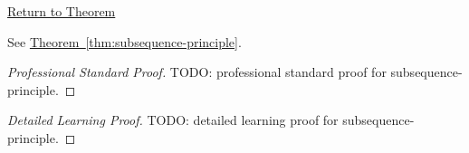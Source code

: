\newpage
{}
\label{prf:subsequence-principle}

\begin{remark*}[Return]
\hyperref[thm:subsequence-principle]{Return to Theorem}
\end{remark*}

\begin{theorem*}
See \hyperref[thm:subsequence-principle]{Theorem~\ref*{thm:subsequence-principle}}.
\end{theorem*}

\begin{proof}[Professional Standard Proof]
\LRAProofBodyStart
TODO: professional standard proof for subsequence-principle.
\end{proof}

\begin{proof}[Detailed Learning Proof]
\LRAProofBodyStart
TODO: detailed learning proof for subsequence-principle.
\end{proof}

\begin{remark*}
\end{remark*}

\begin{dependencies}
\NoLocalDependencies
\end{dependencies}

\clearpage
